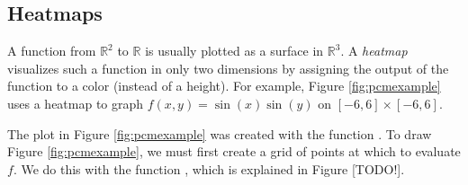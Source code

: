 \subsection*{Heatmaps}
A function from $\mathbb{R}^2$ to $\mathbb{R}$ is usually plotted as a surface in $\mathbb{R}^3$.
A \emph{heatmap} visualizes such a function in only two dimensions by assigning the output of the function to a color (instead of a height).
For example, Figure \ref{fig:pcmexample} uses a heatmap to graph $f(x,y) = \sin(x)\sin(y)$ on $[-6,6] \times [-6,6]$.

The plot in Figure \ref{fig:pcmexample} was created with the function .
To draw Figure \ref{fig:pcmexample}, we must first create a grid of points at which to evaluate $f$.
We do this with the function , which is explained in Figure [TODO!].

